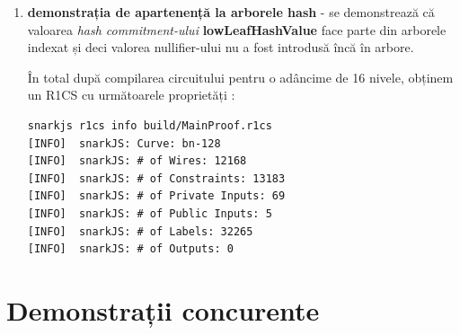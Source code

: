 \documentclass[12pt, letterpaper]{article}
\begin{document}
\begin{enumerate}
    \item{\textbf{demonstrația de apartenență la arborele hash} - se demonstrează că valoarea \emph{hash commitment-ului} \textbf{lowLeafHashValue} face parte din arborele indexat și deci valorea nullifier-ului nu a fost introdusă încă în arbore.}

În total după compilarea circuitului pentru o adâncime de 16 nivele, obținem un R1CS cu următoarele proprietăți :

\begin{lstlisting}
snarkjs r1cs info build/MainProof.r1cs
[INFO]  snarkJS: Curve: bn-128
[INFO]  snarkJS: # of Wires: 12168
[INFO]  snarkJS: # of Constraints: 13183
[INFO]  snarkJS: # of Private Inputs: 69
[INFO]  snarkJS: # of Public Inputs: 5
[INFO]  snarkJS: # of Labels: 32265
[INFO]  snarkJS: # of Outputs: 0
\end{lstlisting}
\end{enumerate}

\pagebreak

\section{Demonstrații concurente}
\printbibliography
\end{document}
